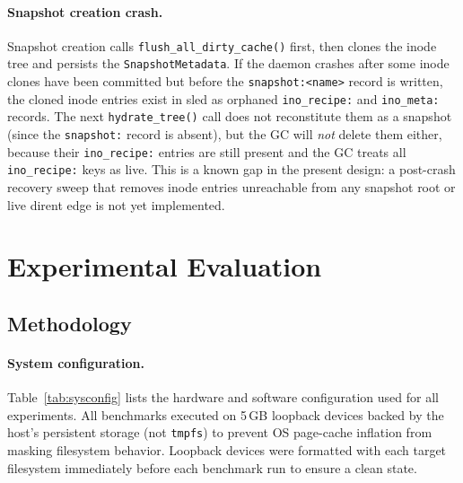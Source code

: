 \documentclass[journal]{IEEEtran}
\begin{document}
\paragraph{Snapshot creation crash.}
Snapshot creation calls \texttt{flush\_all\_dirty\_cache()} first, then
clones the inode tree and persists the \texttt{SnapshotMetadata}.  If
the daemon crashes after some inode clones have been committed but
before the \texttt{snapshot:\textless{}name\textgreater{}} record is
written, the cloned inode entries exist in sled as orphaned
\texttt{ino\_recipe:} and \texttt{ino\_meta:} records.  The next
\texttt{hydrate\_tree()} call does not reconstitute them as a snapshot
(since the \texttt{snapshot:} record is absent), but the GC will
\emph{not} delete them either, because their \texttt{ino\_recipe:}
entries are still present and the GC treats all \texttt{ino\_recipe:}
keys as live.  This is a known gap in the present design: a post-crash recovery sweep
that removes inode entries unreachable from any snapshot root or live
dirent edge is not yet implemented.

\section{Experimental Evaluation}
\label{sec:eval}

\subsection{Methodology}

\paragraph{System configuration.}
Table~\ref{tab:sysconfig} lists the hardware and software configuration
used for all experiments.  All benchmarks executed on 5\,GB loopback
devices backed by the host's persistent storage (not \texttt{tmpfs}) to
prevent OS page-cache inflation from masking filesystem behavior.
Loopback devices were formatted with each target filesystem immediately
before each benchmark run to ensure a clean state.
\end{document}
